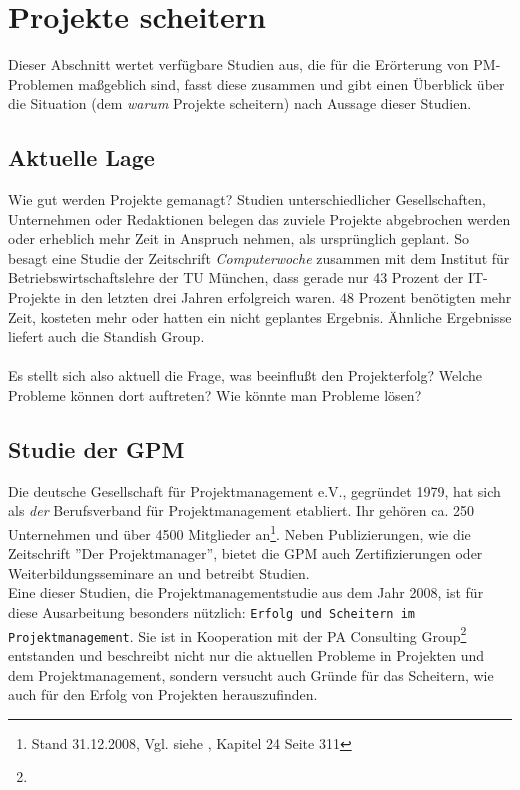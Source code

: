 \documentclass[12pt]{scrartcl}
\begin{document}
\pagebreak
\section{Projekte scheitern}
\label{projekte_scheitern}
Dieser Abschnitt wertet verfügbare Studien aus, die für die Erörterung von PM-Problemen maßgeblich sind, fasst diese zusammen und gibt einen Überblick über die Situation (dem \textit{warum} Projekte scheitern) nach Aussage dieser Studien. 

\subsection{Aktuelle Lage}

Wie gut werden Projekte gemanagt? Studien unterschiedlicher Gesellschaften, Unternehmen oder Redaktionen belegen das zuviele Projekte abgebrochen werden oder erheblich mehr Zeit in Anspruch nehmen, als ursprünglich geplant. So besagt eine Studie der Zeitschrift \textit{Computerwoche} zusammen mit dem Institut für Betriebswirtschaftslehre der TU München, dass gerade nur 43 Prozent der IT-Projekte in den letzten drei Jahren erfolgreich waren. 48 Prozent benötigten mehr Zeit, kosteten mehr oder hatten ein nicht geplantes Ergebnis. Ähnliche Ergebnisse liefert auch die Standish Group. \\
\\
Es stellt sich also aktuell die Frage, was beeinflußt den Projekterfolg? Welche Probleme können dort auftreten? Wie könnte man Probleme lösen?

\subsection{Studie der GPM}
\label{studies_gpm}

Die deutsche Gesellschaft für Projektmanagement e.V., gegründet 1979, hat sich als \textit{der} Berufsverband für Projektmanagement etabliert. Ihr gehören ca. 250 Unternehmen und  über 4500 Mitglieder an\footnote{Stand 31.12.2008, Vgl. siehe \cite{proj_zum_erfolg_fuehren}, Kapitel 24 Seite 311}. Neben Publizierungen, wie die Zeitschrift ''Der Projektmanager'', bietet die GPM auch Zertifizierungen oder Weiterbildungsseminare an und betreibt Studien. \\
Eine dieser Studien, die Projektmanagementstudie aus dem Jahr 2008, ist für diese Ausarbeitung besonders nützlich: \texttt{Erfolg und Scheitern im Projektmanagement}. Sie ist in Kooperation mit der PA Consulting Group\footnote{} entstanden und beschreibt nicht nur die aktuellen Probleme in Projekten und dem Projektmanagement, sondern versucht auch Gründe für das Scheitern, wie auch für den Erfolg von Projekten herauszufinden. 
\end{document}
